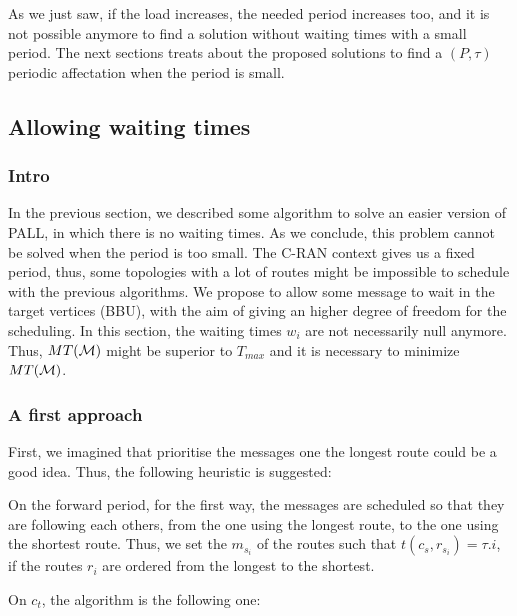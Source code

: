 \documentclass[a4paper,10pt]{article}
\begin{document}
      As we just saw, if the load increases, the needed period increases too, and it is not possible anymore to find a solution without waiting times with a small period. The next sections treats about the proposed solutions to find a $(P,\tau)$ periodic affectation when the period is small.
   \subsection{Allowing waiting times}
    
     \subsubsection{Intro}
     
	  In the previous section, we described some algorithm to solve an easier version of PALL, in which there is no waiting times. As we conclude, this problem cannot be solved when the period is too small. The C-RAN context gives us a fixed period, thus, some topologies with a lot of routes might be impossible to schedule with the previous algorithms. We propose to allow some message to wait in the target vertices (BBU), with the aim of giving an higher degree of freedom for the scheduling. In this section, the waiting times $w_i$ are not necessarily null anymore. Thus, $MT({\cal M})$ might be superior to $T_{max}$ and it is necessary to minimize $MT({\cal M})$.
	   

% 
% 	

     \subsubsection{A first approach}
	  
      First, we imagined that prioritise the messages one the longest route could be a good idea. Thus, the following heuristic is suggested:

      On the forward period, for the first way, the messages are scheduled so that they are following each others, from the one using the longest route, to the one using the shortest route. Thus, we set the $m_{s_i}$ of the routes such that  $t(c_s,r_{s_i}) = \tau.i$, if the routes $r_i$ are ordered from the longest to the shortest.

      On $c_t$, the algorithm is the following one:
\end{document}
